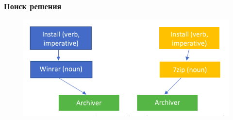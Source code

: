 \documentclass[14pt]{beamer}
\begin{document}



\begin{frame}
\frametitle{Поиск решения}
\begin{figure} [h] 
  \center
  \includegraphics [scale=0.5] {SolutionSearch1}
  \label{img:SolutionSearch1}  
\end{figure}
\end{frame}
\end{document}
